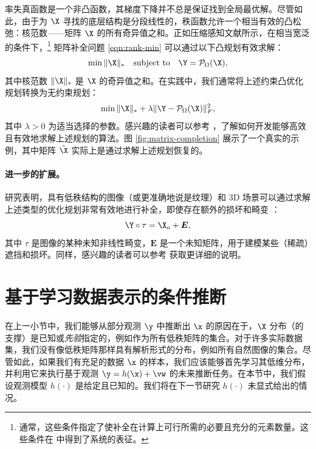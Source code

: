 \documentclass[../../book-main_zh.tex]{subfiles}
\begin{document}
率失真函数是一个非凸函数，其梯度下降并不总是保证找到全局最优解。尽管如此，由于为 $\X$ 寻找的底层结构是分段线性的，秩函数允许一个相当有效的凸松弛：核范数——矩阵 $\X$ 的所有奇异值之和。正如压缩感知文献所示，在相当宽泛的条件下，\footnote{通常，这些条件指定了使补全在计算上可行所需的必要且充分的元素数量。这些条件在 \cite{Wright-Ma-2022} 中得到了系统的表征。} 矩阵补全问题 \eqref{eqn:rank-min} 可以通过以下凸规划有效求解：
\begin{equation}
    \min \|\X\|_* \quad \mbox{subject to}
    \quad
    \Y = \mathcal{P}_{\Omega}(\X),
    \label{eqn:nuclear-min}
\end{equation}
其中核范数 $\|\X\|_*$ 是 $\X$ 的奇异值之和。在实践中，我们通常将上述约束凸优化规划转换为无约束规划：
\begin{equation}
    \min \|\X\|_*  + \lambda \|
    \Y - \mathcal{P}_{\Omega}(\X)\|_F^2,
    \label{eqn:nuclear-min-lagrangian}
\end{equation}
其中 $\lambda > 0$ 为适当选择的参数。感兴趣的读者可以参考 \cite{Wright-Ma-2022}，了解如何开发能够高效且有效地求解上述规划的算法。图 \ref{fig:matrix-completion} 展示了一个真实的示例，其中矩阵 $\hat \X$ 实际上是通过求解上述规划恢复的。

\paragraph{进一步的扩展。}
研究表明，具有低秩结构的图像（或更准确地说是纹理）和 3D 场景可以通过求解上述类型的优化规划非常有效地进行补全，即使存在额外的损坏和畸变 \cite{Zhang2010TILTTI,Liang-ECCV2012,Yi_2023_ICCV}：
\begin{equation}
    \Y \circ \tau = \X_o + \boldsymbol{E},
\end{equation}
其中 $\tau$ 是图像的某种未知非线性畸变，$\boldsymbol{E}$ 是一个未知矩阵，用于建模某些（稀疏）遮挡和损坏。同样，感兴趣的读者可以参考 \cite{Wright-Ma-2022} 获取更详细的说明。

\section{基于学习数据表示的条件推断}
在上一小节中，我们能够从部分观测 $\y$ 中推断出 $\x$ 的原因在于，$\X$ 分布（的支撑）是已知或{\em 先验}指定的，例如作为所有低秩矩阵的集合。对于许多实际数据集，我们没有像低秩矩阵那样具有解析形式的分布，例如所有自然图像的集合。尽管如此，如果我们有充足的数据 $\x$ 的样本，我们应该能够首先学习其低维分布，并利用它来执行基于观测 $\y = h(\x) + \vw$ 的未来推断任务。在本节中，我们假设观测模型 $h(\cdot)$ 是给定且已知的。我们将在下一节研究 $h(\cdot)$ 未显式给出的情况。
\end{document}

